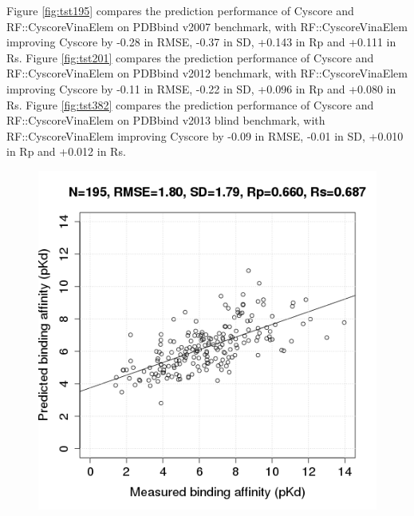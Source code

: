 \documentclass[journal=jacsat,manuscript=article]{achemso}
\begin{document}
Figure \ref{fig:tst195} compares the prediction performance of Cyscore and RF::CyscoreVinaElem on PDBbind v2007 benchmark, with RF::CyscoreVinaElem improving Cyscore by -0.28 in RMSE, -0.37 in SD, +0.143 in Rp and +0.111 in Rs. Figure \ref{fig:tst201} compares the prediction performance of Cyscore and RF::CyscoreVinaElem on PDBbind v2012 benchmark, with RF::CyscoreVinaElem improving Cyscore by -0.11 in RMSE, -0.22 in SD, +0.096 in Rp and +0.080 in Rs. Figure \ref{fig:tst382} compares the prediction performance of Cyscore and RF::CyscoreVinaElem on PDBbind v2013 blind benchmark, with RF::CyscoreVinaElem improving Cyscore by -0.09 in RMSE, -0.01 in SD, +0.010 in Rp and +0.012 in Rs.

\begin{figure}
\includegraphics[width=1.4\linewidth,natwidth=480,natheight=480]{../rfcyscore/x4/mlr/trn-247-tst-195-yp.png}
\endminipage\hfill
{}

\end{figure}
\end{document}
